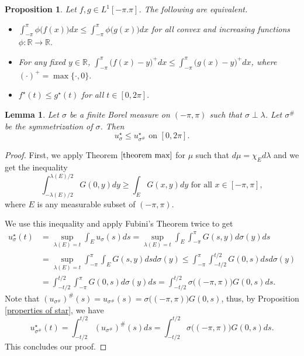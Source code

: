 \documentclass[11pt]{amsart}
\newtheorem{proposition}[theorem]{Proposition}
\newtheorem{lemma}[theorem]{Lemma}
\numberwithin{equation}{section}
\begin{document}
\begin{proposition}\label{prop star means}
Let \(f,g\in L^1[-\pi.\pi]\). The following are equivalent.
\begin{itemize}
    \item[(a)] \(\displaystyle\int_{-\pi}^\pi\phi\bigl(f(x)\bigr)dx\leq\int_{-\pi}^\pi\phi\bigl(g(x)\bigr)dx\) for all convex and increasing functions \(\phi:\mathbb{R}\to\mathbb{R}.\)
    \item[(b)]  For any fixed \(y\in\mathbb{R}\), \(\displaystyle\int_{-\pi}^\pi\bigl(f(x)-y\bigr)^+dx\leq\int_{-\pi}^\pi\bigl(g(x)-y\bigr)^+dx\), where \((\cdot)^+=\max\{\cdot,0\}.\)
    \item[(c)] \(f^\star(t)\leq g^\star(t)\) for all \(t\in[0,2\pi].\)
\end{itemize}
\end{proposition}
\begin{lemma}\label{lemma star} Let \(\sigma\) be a finite Borel measure on \((-\pi,\pi)\) such that \(\sigma\perp\lambda\). Let \(\sigma^\#\) be the symmetrization of \(\sigma\). Then
\begin{equation}\label{star u sigma}
u^\star_\sigma\leq u^\star_{\sigma^\#} \text{ on }[0,2\pi].
\end{equation}
\end{lemma}
\begin{proof}
First, we apply Theorem \(\ref{theorem max}\) for \(\mu\) such that \(d\mu=\chi_Ed\lambda\) and we get the inequality
\begin{equation}\label{lemma green E}
\int_{-\lambda(E)/2}^{\lambda(E)/2} G(0,y)dy\geq \int_E G(x,y)dy \text{ for all }x\in[-\pi,\pi],
\end{equation}
where \(E\) is any measurable subset of \((-\pi,\pi)\).
\par We use this inequality and apply Fubini's Theorem twice to get
\begin{align*}
u_\sigma^\star(t)&=\sup_{\lambda(E)=t}\int_E u_\sigma(s)ds=\sup_{\lambda(E)=t}\int_E\int_{-\pi}^\pi G(s,y)d\sigma(y)ds\\
&=\sup_{\lambda(E)=t}\int_{-\pi}^\pi\int_E G(s,y)dsd\sigma(y)\leq\int_{-\pi}^\pi\int_{-t/2}^{t/2} G(0,s)dsd\sigma(y)\\
&=\int_{-t/2}^{t/2}\int_{-\pi}^\pi G(0,s)d\sigma(y)ds=\int_{-t/2}^{t/2}\sigma\bigl((-\pi,\pi)\bigr)G(0,s)ds.
\end{align*}
Note that \((u_{\sigma^\#})^\#(s)=u_{\sigma^\#}(s)=\sigma\bigl((-\pi,\pi)\bigr)G(0,s)\), thus, by Proposition \ref{properties of star}, we have
\[u_{\sigma^\#}^\star(t)=\int_{-t/2}^{t/2}(u_{\sigma^\#})^\#(s)ds=\int_{-t/2}^{t/2}\sigma\bigl((-\pi,\pi)\bigr)G(0,s)ds.\]
This concludes our proof.
\end{proof}
\end{document}
